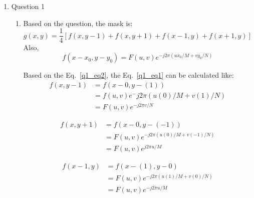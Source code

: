 \documentclass[12pt]{article}
\begin{document}
\begin{enumerate}[leftmargin=\labelsep]
\item Question 1
    \begin{enumerate}
        \item Based on the question, the mask is:
        \begin{equation}
            g(x, y) = \frac{1}{4}[f(x, y-1) + f(x, y+1) +f(x-1, y) +f(x+1, y)]  
            \label{q1_eq1}    
        \end{equation}
        Also, 
        \begin{equation}
            f(x - x_{0}, y - y_{0}) = F(u, v)e^{-j2 \pi (ux_{0}/M + vy_{0}/N)}
            \label{q1_eq2}
        \end{equation}

        Based on the Eq.~\ref{q1_eq2}, the Eq.~\ref{q1_eq1} can be calculated like:
        \begin{equation}
        \begin{aligned}
        f(x, y-1)
        &= f(x - 0, y -(1))\\
        &= f(u, v)e^-j2\pi(u(0)/M + v(1)/N)\\
        &= F(u, v)e^{-j2\pi v/N}
        \label{q1_eq3}
        \end{aligned}
        \end{equation}
        
        \begin{equation}
            \begin{aligned}
                f(x, y+1) 
                &= f(x-0, y-(-1))\\
                &= F(u, v)e^{-j2\pi (u(0)/M + v(-1)/N)}\\
                &= F(u, v)e^{j2\pi u/M}
            \label{q1_eq3}
            \end{aligned}
        \end{equation}

        \begin{equation}
            \begin{aligned}
                f(x -1, y) 
                &= f(x-(1), y-0)\\
                &= F(u, v)e^{-j2\pi(u(1)/M + v(0)/N)}\\
                &= F(u, v)e^{-j2\pi u/M}
            \label{q1_eq4}
            \end{aligned}
        \end{equation}


\end{enumerate}
\end{enumerate}
\end{document}
